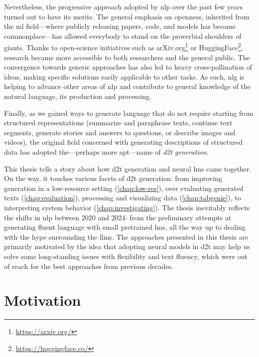 Nevertheless, the progressive approach adopted by \ac{nlp} over the past few years turned out to have its merits. The general emphasis on openness, inherited from the \ac{ml} field---where publicly releasing papers, code, and models has become commonplace---has allowed everybody to stand on the proverbial shoulders of giants. Thanks to open-science initiatives such as arXiv.org\footnote{\url{https://arxiv.org/}} or HuggingFace\footnote{\url{https://huggingface.co/}}, research became more accessible to both researchers and the general public. The convergence towards generic approaches has also led to heavy cross-pollination of ideas, making specific solutions easily applicable to other tasks. As such, \ac{nlg} is helping to advance other areas of \ac{nlp} and contribute to general knowledge of the natural language, its production and processing.

Finally, as we gained ways to generate language that do not require starting from structured representations (summarize and paraphrase texts, continue text segments, generate stories and answers to questions, or describe images and videos), %
the original field concerned with generating descriptions of structured data has adopted the---perhaps more apt---name of \emph{\ac{d2t} generation}.

This thesis tells a story about how \acl{d2t} generation and neural \aclp{lm} came together. On the way, it touches various facets of \ac{d2t} generation: from improving generation in a low-resource setting (\autoref{chap:low-res}), over evaluating generated texts (\autoref{chap:evaluation}), processing and visualizing data (\autoref{chap:tabgenie}), to interpreting system behavior (\autoref{chap:investigating}).
The thesis inevitably reflects the shifts in \ac{nlp} between 2020 and 2024: from the preliminary attempts at generating fluent language with small pretrained \acp{lm}, all the way up to dealing with the hype surrounding the \acp{llm}. The approaches presented in this thesis are primarily motivated by the idea that adopting neural models in \ac{d2t} may help us solve some long-standing issues with flexibility and text fluency, which were out of reach for the best approaches from previous decades.




\section{Motivation}
\label{sec:rq}

